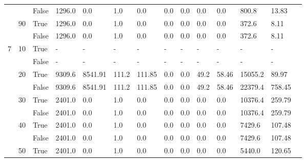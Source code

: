 \documentclass{article}
\begin{document}
\begin{landscape}
\begin{small}
\begin{longtable}[c]{@{}lll|ll|ll|ll|ll|lll@{}}
   &    & False & 1296.0          & 0.0            & 1.0           & 0.0           & 0.0           & 0.0           & 0.0           & 0.0           & 800.8         & 13.83       &  \\
   & 90 & True  & 1296.0          & 0.0            & 1.0           & 0.0           & 0.0           & 0.0           & 0.0           & 0.0           & 372.6         & 8.11        &  \\
   &    & False & 1296.0          & 0.0            & 1.0           & 0.0           & 0.0           & 0.0           & 0.0           & 0.0           & 372.6         & 8.11        &  \\
  \midrule
7  & 10 & True  & -               & -              & -             & -             & -             & -             & -             & -             & -             & -           &  \\
   &    & False & -               & -              & -             & -             & -             & -             & -             & -             & -             & -           &  \\
   & 20 & True  & 9309.6          & 8541.91        & 111.2         & 111.85        & 0.0           & 0.0           & 49.2          & 58.46         & 15055.2       & 89.97       &  \\
   &    & False & 9309.6          & 8541.91        & 111.2         & 111.85        & 0.0           & 0.0           & 49.2          & 58.46         & 22379.4       & 758.45      &  \\
   & 30 & True  & 2401.0          & 0.0            & 1.0           & 0.0           & 0.0           & 0.0           & 0.0           & 0.0           & 10376.4       & 259.79      &  \\
   &    & False & 2401.0          & 0.0            & 1.0           & 0.0           & 0.0           & 0.0           & 0.0           & 0.0           & 10376.4       & 259.79      &  \\
   & 40 & True  & 2401.0          & 0.0            & 1.0           & 0.0           & 0.0           & 0.0           & 0.0           & 0.0           & 7429.6        & 107.48      &  \\
   &    & False & 2401.0          & 0.0            & 1.0           & 0.0           & 0.0           & 0.0           & 0.0           & 0.0           & 7429.6        & 107.48      &  \\
   & 50 & True  & 2401.0          & 0.0            & 1.0           & 0.0           & 0.0           & 0.0           & 0.0           & 0.0           & 5440.0        & 120.65      &  \\

\end{longtable}
\end{small}
\end{landscape}
\end{document}

